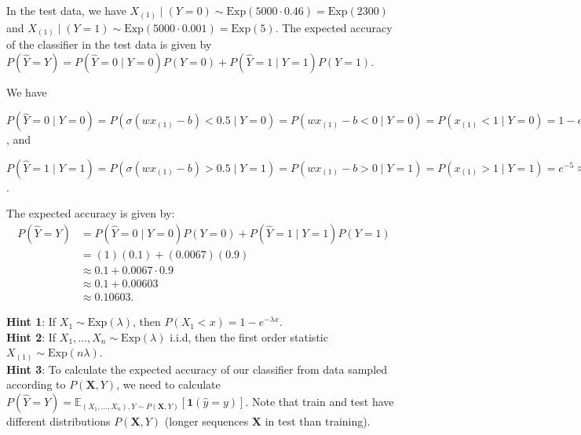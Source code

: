 \begin{enumerate}
\begin{enumerate}
    In the test data, we have $X_{(1)} \mid (Y = 0) \sim \text{Exp}(5000 \cdot
    0.46) = \text{Exp}(2300)$ and $X_{(1)} \mid (Y = 1) \sim \text{Exp}(5000
    \cdot 0.001) = \text{Exp}(5)$.
    The expected accuracy of the classifier in the test data is given by
    $P(\hat{Y} = Y) = P(\hat{Y} = 0 \mid Y = 0) P(Y = 0) + P(\hat{Y} = 1 \mid Y
    = 1) P(Y = 1)$.

    We have 
    
    $P(\hat{Y} = 0 \mid Y = 0) = P(\sigma(w x_{(1)} - b) < 0.5 \mid Y = 0) = P(w
    x_{(1)} - b < 0 \mid Y = 0) = P(x_{(1)} < 1 \mid Y = 0) = 1 - e^{-2300}
    \approx 1$, and 
    
    $P(\hat{Y} = 1 \mid Y = 1) = P(\sigma(w x_{(1)} - b) > 0.5 \mid Y = 1) =
    P(w x_{(1)} - b > 0 \mid Y = 1) = P(x_{(1)} > 1 \mid Y = 1) = e^{-5} \approx
    0.0067$.

    The expected accuracy is given by:
    \begin{align*}
        P(\hat{Y} = Y) &= P(\hat{Y} = 0 \mid Y = 0) P(Y = 0) + P(\hat{Y} = 1 \mid Y = 1) P(Y = 1)\\
        &= (1)(0.1) + (0.0067)(0.9)\\
        &\approx 0.1 + 0.0067 \cdot 0.9\\
        &\approx 0.1 + 0.00603\\
        &\approx 0.10603.
    \end{align*}

\end{enumerate}
{\bf Hint 1}: If $X_1\sim \text{Exp}(\lambda)$, then $P(X_1 < x) = 1 - e^{-\lambda x}$.\\
{\bf Hint 2}: If $X_1,...,X_n\sim \text{Exp}(\lambda)$ i.i.d, then the first order statistic $X_{(1)}\sim \text{Exp}(n\lambda)$.\\
{\bf Hint 3}: To calculate the expected accuracy of our classifier from data sampled according to $P(\mathbf{X},Y)$, we need to calculate $ P(\hat{Y} = Y) = \mathbb{E}_{(X_1,...,X_n),Y\sim P(\mathbf{X},Y)} [ \mathbf{1}(\hat{y} = y)]$. Note that train and test have different distributions $P(\mathbf{X},Y)$ (longer sequences $\mathbf{X}$ in test than training).
\end{enumerate}
